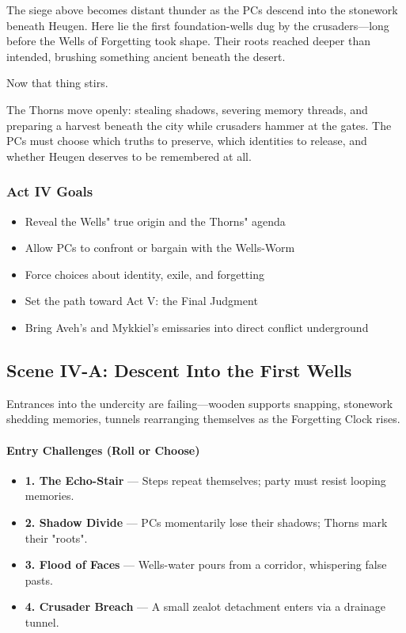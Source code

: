\documentclass[11pt]{book}
\begin{document}
The siege above becomes distant thunder as the PCs descend into the
stonework beneath Heugen. Here lie the first foundation-wells dug by the
crusaders---long before the Wells of Forgetting took shape. Their roots
reached deeper than intended, brushing something ancient beneath the
desert.

Now that thing stirs.

The Thorns move openly: stealing shadows, severing memory threads, and
preparing a harvest beneath the city while crusaders hammer at the gates.
The PCs must choose which truths to preserve, which identities to release,
and whether Heugen deserves to be remembered at all.

\subsubsection*{Act IV Goals}
\begin{itemize}[leftmargin=*]
    \item Reveal the Wells" true origin and the Thorns" agenda
    \item Allow PCs to confront or bargain with the Wells-Worm
    \item Force choices about identity, exile, and forgetting
    \item Set the path toward Act V: the Final Judgment
    \item Bring Aveh's and Mykkiel's emissaries into direct conflict underground
\end{itemize}

\subsection*{Scene IV-A: Descent Into the First Wells}

Entrances into the undercity are failing---wooden supports snapping,
stonework shedding memories, tunnels rearranging themselves as the
Forgetting Clock rises.

\paragraph{Entry Challenges (Roll or Choose)}
\begin{itemize}[leftmargin=*]
    \item \textbf{1. The Echo-Stair} --- Steps repeat themselves; party must resist looping memories.
    \item \textbf{2. Shadow Divide} --- PCs momentarily lose their shadows; Thorns mark their "roots".
    \item \textbf{3. Flood of Faces} --- Wells-water pours from a corridor, whispering false pasts.
    \item \textbf{4. Crusader Breach} --- A small zealot detachment enters via a drainage tunnel.
\end{itemize}
\end{document}
